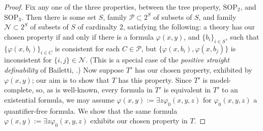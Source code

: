 \documentclass{amsart}
\theoremstyle{definition}
\theoremstyle{remark}
\numberwithin{equation}{section}
\begin{document}
\begin{proof}
   Fix any one of the three properties, between the tree property, $\mathrm{SOP}_{2}$, and $\mathrm{SOP}_{3}$. Then there is some set $S$, family $\mathcal{P} \subset 2^{S}$ of subsets of $S$, and family $\mathcal{N} \subset 2^{S}$ of subsets of $S$ of cardinalty $2$, satisfying the following: a theory has our chosen property if and only if there is a formula $\varphi(x, y)$, and $\{b_{i}\}_{i \in S}$, such that $\{\varphi(x, b_{i})\}_{i \in C}$ is consistent for each $C \in \mathcal{P}$, but $\{\varphi(x, b_{i}), \varphi(x, b_{j}) \}$ is inconsistent for $\{i, j\} \in \mathcal{N}$.  (This is a special case of the \textit{positive straight definability} of Bailetti, \cite{Bailetti25}.) Now suppose $T'$ has our chosen property, exhibited by $\varphi(x, y)$; our aim is to show that $T$ has this property. Since $T'$ is model-complete, so, as is well-known, every formula in $T'$ is equivalent in $T'$ to an existential formula, we may assume $\varphi(x, y) := \exists z \varphi_{0}(x, y, z)$ for $\varphi_{0}(x, y, z)$ a quantifier-free formula. We show that the same formula $\varphi(x, y) := \exists z \varphi_{0}(x, y, z)$ exhibits our chosen property in $T$.



\end{proof}
\end{document}
